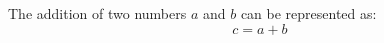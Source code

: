 \documentclass{article}
\begin{document}
The addition of two numbers \(a\) and \(b\) can be represented as:
\[
c = a + b
\]
\end{document}
